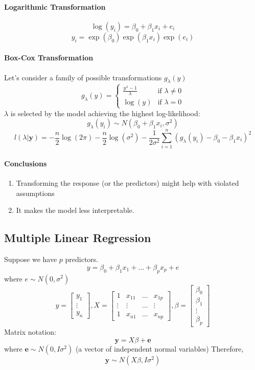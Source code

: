 \documentclass[11pt]{article}
\newcommand{\tb}[1]{\textbf{#1}}
\newcommand{\vy}[0]{\tb{y}}
\newcommand{\ve}[0]{\tb{e}}
\begin{document}
\paragraph{Logarithmic Transformation}
$$\log(y_i) = \beta_0 + \beta_1 x_i + e_i$$
$$y_i = \exp(\beta_0)\exp(\beta_1x_i)\exp(e_i)$$
\paragraph{Box-Cox Transformation}
Let's consider a family of possible transformations $g_\lambda(y)$
$$g_\lambda(y)=\begin{cases}
	\frac{y^\lambda-1}{\lambda} & \text{if $\lambda \neq 0$} \\
	\log(y) & \text{if $\lambda = 0$}
\end{cases}$$
$\lambda$ is selected by the model achieving the highest log-likelihood:
$$g_\lambda(y_i) \sim N(\beta_0 + \beta_1x_i, \sigma^2)$$
$$l(\lambda|\vy) = -\frac{n}{2}\log(2\pi) - \frac{n}{2}\log(\sigma^2) - \frac{1}{2\sigma^2}\sum_{i=1}^n(g_\lambda(y_i) - \beta_0 - \beta_1x_i)^2$$
\paragraph{Conclusions}
\begin{enumerate}
	\item Transforming the response (or the predictors) might help with violated assumptions
	\item It makes the model less interpretable.
\end{enumerate}
\subsection{Multiple Linear Regression}
Suppose we have $p$ predictors.
$$y = \beta_0 + \beta_1x_1 + \hdots + \beta_p x_p + e$$ where $e \sim N(0, \sigma^2)$
$$y = \begin{bmatrix} y_1 \\ \vdots \\ y_n \end{bmatrix},
X = \begin{bmatrix}
	1 & x_{11} & \hdots & x_{1p} \\
	\vdots & \vdots & \hdots & \vdots \\
	1 & x_{n1} & \hdots & x_{np}
\end{bmatrix}, \beta = \begin{bmatrix}
	\beta_0 \\ \beta_1 \\ \vdots \\ \beta_p
\end{bmatrix}$$
Matrix notation:
$$\vy = X\beta + \ve$$ where $\ve \sim N(0, I\sigma^2)$ (a vector of independent normal variables)
Therefore,
$$ \vy \sim N(X\beta, I\sigma^2)$$
\end{document}
